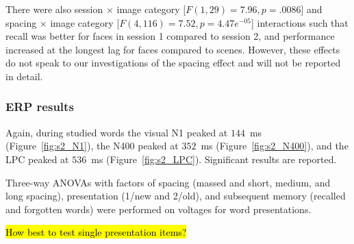 There were also session $\times$ image category [$F(1,29)=7.96, p=.0086$] and spacing $\times$ image category [$F(4,116)=7.52, p=4.47e^{-05}$] interactions such that recall was better for faces in session 1 compared to session 2, and performance increased at the longest lag for faces compared to scenes.  However, these effects do not speak to our investigations of the spacing effect and will not be reported in detail.

\subsubsection{ERP results}

Again, during studied words the visual N1 peaked at $144$~ms (Figure~\ref{fig:s2_N1}), the N400 peaked at $352$~ms (Figure~\ref{fig:s2_N400}), and the LPC peaked at $536$~ms (Figure~\ref{fig:s2_LPC}).  Significant results are reported.


Three-way ANOVAs with factors of spacing (massed and short, medium, and long spacing), presentation (1/new and 2/old), and subsequent memory (recalled and forgotten words) were performed on voltages for word presentations.

\hl{How best to test single presentation items?}



